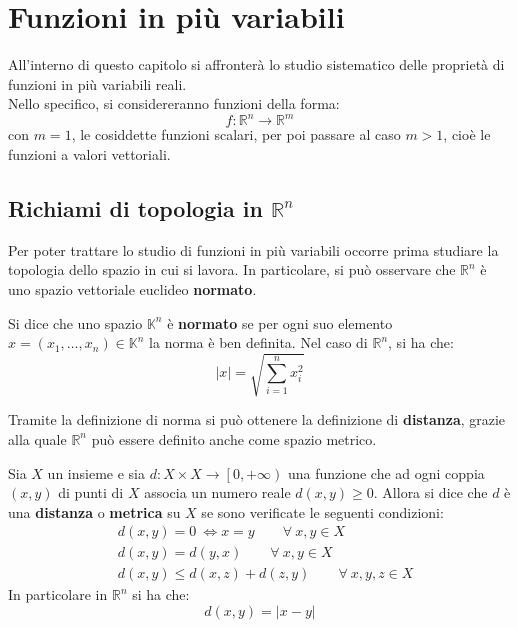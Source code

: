 \chapter{Funzioni in più variabili}
All'interno di questo capitolo si affronterà lo studio sistematico delle proprietà di funzioni in più variabili reali.\\
Nello specifico, si considereranno funzioni della forma: 
\begin{equation}
    f:\mathbb{R}^n \to \mathbb{R}^m
\end{equation}
con $m=1$, le cosiddette funzioni scalari, per poi passare al caso $m>1$, cioè le funzioni a valori vettoriali.
\section{Richiami di topologia in $\mathbb{R}^n$}
Per poter trattare lo studio di funzioni in più variabili occorre prima studiare la topologia dello spazio in cui si lavora.
In particolare, si può osservare che $\mathbb{R}^n$ è uno spazio vettoriale euclideo \textbf{normato}.
\begin{definition}
    Si dice che uno spazio $\mathbb{K}^n$ è \textbf{normato} se per ogni suo elemento $x=(x_1,\dots,x_n) \in \mathbb{K}^n$ la norma è ben definita. Nel caso di $\mathbb{R}^n$, si ha che:
    \begin{equation}
        |x|=\sqrt{\sum\limits_{i=1}^{n}{x_i^2}}
    \end{equation}
\end{definition}
Tramite la definizione di norma si può ottenere la definizione di \textbf{distanza}, grazie alla quale $\mathbb{R}^n$ può essere definito anche come spazio metrico.
\begin{definition} \label{Def: Distanza}
    Sia $X$ un insieme e sia $d:X \times X \to \left[0, +\infty \right)$ una funzione che ad ogni coppia $(x,y)$ di punti di $X$ associa un numero reale $d(x,y)\geq0$. Allora si dice che $d$ è una \textbf{distanza} o \textbf{metrica} su $X$ se sono verificate le seguenti condizioni:
    \begin{align}
        &d(x,y)=0 \ \iff x=y \qquad\forall\ x,y \in X \\
        &d(x,y)=d(y,x) \qquad \forall\ x,y \in X \\
        &d(x,y) \leq d(x,z) + d(z, y) \qquad \forall\ x,y,z \in X
    \end{align}
    In particolare in $\mathbb{R}^n$ si ha che:
    \begin{equation}
        d(x, y)=|x-y|
    \end{equation}
\end{definition}
